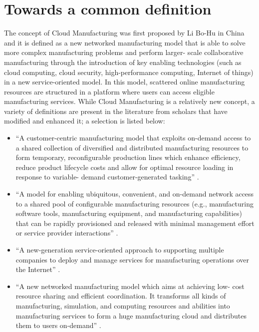 \section{Towards a common definition}
The concept of Cloud Manufacturing was first proposed by Li Bo-Hu in China \parencite{bo-hu_cloud_2010} and it is defined as a new networked manufacturing model that is able to solve more complex manufacturing problems and perform larger- scale collaborative manufacturing through the introduction of key enabling technologies (such as cloud computing, cloud security, high-performance computing, Internet of things) in a new service-oriented model. In this model, scattered online manufacturing resources are structured in a platform where users can access eligible manufacturing services. While Cloud Manufacturing is a relatively new concept, a variety of definitions are present in the literature from scholars that have modified and enhanced it; a selection is listed below:
\begin{itemize}
    \item “A customer-centric manufacturing model that exploits on-demand access to a shared collection of diversified and distributed manufacturing resources to form temporary, reconfigurable production lines which enhance efficiency, reduce product lifecycle costs and allow for optimal resource loading in response to variable- demand customer-generated tasking” \parencite{wu_cloud_2013}.
    \item “A model for enabling ubiquitous, convenient, and on-demand network access to a shared pool of configurable manufacturing resources (e.g., manufacturing software tools, manufacturing equipment, and manufacturing capabilities) that can be rapidly provisioned and released with minimal management effort or service provider interactions” \parencite{xu_cloud_2012}.
    \item “A new-generation service-oriented approach to supporting multiple companies to deploy and manage services for manufacturing operations over the Internet” \parencite{vincent_wang_interoperable_2013}.
    \item “A new networked manufacturing model which aims at achieving low- cost resource sharing and efficient coordination. It transforms all kinds of manufacturing, simulation, and computing resources and abilities into manufacturing services to form a huge manufacturing cloud and distributes them to users on-demand” \parencite{laili_study_2012}.
\end{itemize}


